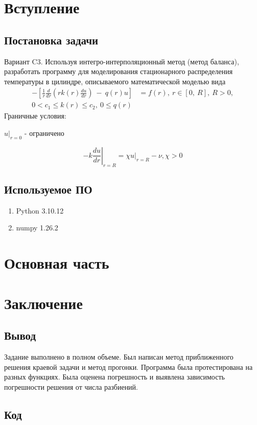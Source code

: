 \documentclass[a4paper,12pt]{article}
\begin{document}
	
	\newpage
	\tableofcontents
	\newpage

	\section{Вступление}
	\subsection{Постановка задачи}

	Вариант C3. Используя интегро-интерполяционный метод (метод баланса), разработать программу для моделирования стационарного распределения температуры в цилиндре, описываемого математической моделью вида
	\begin{align*}
		-\left[ \frac{1}{r} \frac{d}{dr} \left(r k(r)\frac{du}{dr} \right)\ -\ q(r)u \right]
		&= f(r),\ r \in \left[ 0,\ R\right],\ R > 0,
		\\
		 0 < c_1 \leq k(r) \leq c_2,\ 0 \leq q(r)&
	\end{align*}
	Граничные условия: 
 
	\centerline{\(\left. u\right\vert_{r = 0}\) - ограничено}
	\[-k \left. \frac{du}{dr}\right\vert_{r = R} = \chi\left.u\right\vert_{r = R} - \nu, \chi > 0\]
    
	\subsection{Используемое ПО}

	\begin{enumerate}
		\item Python 3.10.12
		\item numpy 1.26.2
	\end{enumerate}
	\newpage

	\section{Основная часть}
	

	
	\newpage

	
	\newpage

	
	\newpage

	\section{Заключение}
	\subsection{Вывод}
	Задание выполнено в полном объеме.
	Был написан метод приближенного решения краевой задачи и метод прогонки.
	Программа была протестирована на разных функциях.
	Была оценена погрешность и выявлена зависимость погрешности решения от числа разбиений.
	\newpage
	\subsection{Код}
	\inputminted{python}{main.py}
\end{document}
